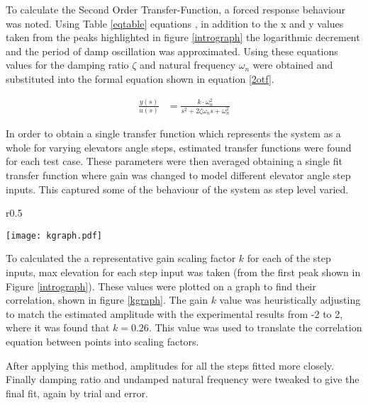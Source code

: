 To calculate the Second Order Transfer-Function, a forced response
behaviour was noted. Using Table \ref{eqtable} equations \cite{vibnote}
\cite{vibnote2}, in addition to the x and y values taken from the peaks
highlighted in figure \ref{intrograph} the logarithmic decrement and the
period of damp oscillation was approximated. Using these equations
values for the damping ratio \(\zeta\) and natural frequency
\(\omega_n\) were obtained and substituted into the formal equation
shown in equation \ref{2otf}.

\begin{align}
\frac{ y(s) }{ u(s) } &=\frac{ k\cdot \omega_{ n }^{ 2 } }{ s^{ 2 }+2\zeta \omega_{ n }s+\omega_{ n }^{ 2 } } \label{2otf}
\end{align}

In order to obtain a single transfer function which represents the
system as a whole for varying elevators angle steps, estimated transfer
functions were found for each test case. These parameters were then
averaged obtaining a single fit transfer function where gain was changed
to model different elevator angle step inputs. This captured some of the
behaviour of the system as step level varied.

\begin{wrapfigure}{r}{0.5\textwidth}
  \begin{center}
  \vspace{-20pt}
\texttt{[image: kgraph.pdf]}  
\end{center}
\caption{Graph Finding the Gain For Each Step Input}
\label{kgraph}
  \vspace{-15pt}
\end{wrapfigure}

To calculated the a representative gain scaling factor \(k\) for each of
the step inputs, max elevation for each step input was taken (from the
first peak shown in Figure \ref{intrograph}). These values were plotted
on a graph to find their correlation, shown in figure \ref{kgraph}. The
gain \(k\) value was heuristically adjusting to match the estimated
amplitude with the experimental results from -2 to 2, where it was found
that \(k = 0.26\). This value was used to translate the correlation
equation between points into scaling factors.

After applying this method, amplitudes for all the steps fitted more
closely. Finally damping ratio and undamped natural frequency were
tweaked to give the final fit, again by trial and error.

